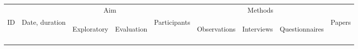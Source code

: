\documentclass{article}[10pt]
\begin{document}
\begin{table}[h]
\begin{tabular}{@{}lllllllll@{}}	
\toprule
   &                             & \multicolumn{2}{c}{Aim}                    &          & \multicolumn{3}{c}{Methods}            &    \\ \cline{3-4} \cline{6-8}  \noalign{\smallskip}
ID & Date, duration & \begin{turn}{90}Exploratory\end{turn} & \begin{turn}{90}Evaluation\end{turn} & Participants & \begin{turn}{90}Observations\end{turn} & \begin{turn}{90}Interviews\end{turn} & \begin{turn}{90}Questionnaires\end{turn}   & Papers \\ \midrule \noalign{\smallskip}


\end{tabular}
\end{table}
\end{document}
